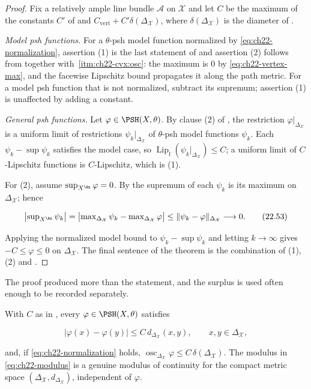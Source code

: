 \begin{proof}
Fix a relatively ample line bundle \(\mathcal A\) on \(\mathcal X\) and let
\(C\) be the maximum of the constants \(C'\) of
 and
\(C_{\mathrm{vert}}+C'\delta(\Delta_{\mathcal X})\), where
\(\delta(\Delta_{\mathcal X})\) is the diameter of
.

\emph{Model psh functions.}  For a \(\theta\)-psh model function normalized
by \eqref{eq:ch22-normalization}, assertion (1) is the last statement of
 and assertion (2) follows from
 together with
\,\cref{itm:ch22-cvx:osc}: the maximum
is \(0\) by \eqref{eq:ch22-vertex-max}, and the facewise Lipschitz bound
propagates it along the path metric.  For a model psh function that is not
normalized, subtract its supremum; assertion (1) is unaffected by adding a
constant.

\emph{General psh functions.}  Let \(\varphi\in\PSH(X,\theta)\).  By clause
(2) of , the restriction
\(\varphi|_{\Delta_{\mathcal X}}\) is a uniform limit of restrictions
\(\psi_k|_{\Delta_{\mathcal X}}\) of \(\theta\)-psh model functions
\(\psi_k\).  Each \(\psi_k-\sup\psi_k\) satisfies the model case, so
\(\operatorname{Lip}_{\mathrm f}(\psi_k|_{\Delta_{\mathcal X}})\leq C\); a
uniform limit of \(C\)-Lipschitz functions is \(C\)-Lipschitz, which is (1).

For (2), assume \(\sup_{X^{\An}}\varphi=0\).  By
 the supremum of each \(\psi_k\) is its
maximum on \(\Delta_{\mathcal X}\); hence

\[
 \bigl|\sup\nolimits_{X^{\An}}\psi_k\bigr|
 =\bigl|\max\nolimits_{\Delta_{\mathcal X}}\psi_k
    -\max\nolimits_{\Delta_{\mathcal X}}\varphi\bigr|
 \leq\|\psi_k-\varphi\|_{\Delta_{\mathcal X}}\longrightarrow0 .
\tag{22.53}\label{eq:ch22-normalizing-constants-vanish}
\]

Applying the normalized model bound to \(\psi_k-\sup\psi_k\) and letting
\(k\to\infty\) gives \(-C\leq\varphi\leq0\) on
\(\Delta_{\mathcal X}\).  The final sentence of the theorem is the
combination of (1), (2) and .
\end{proof}

The proof produced more than the statement, and the surplus is used often
enough to be recorded separately.

\begin{corollary}
\label{cor:ch22-explicit-modulus}
With \(C\) as in , every
\(\varphi\in\PSH(X,\theta)\) satisfies

\[
 \bigl|\varphi(x)-\varphi(y)\bigr|\leq C\,d_{\Delta_{\mathcal X}}(x,y),
 \qquad x,y\in\Delta_{\mathcal X},
\tag{22.54}\label{eq:ch22-modulus}
\]

and, if \eqref{eq:ch22-normalization} holds,
\(\operatorname{osc}_{\Delta_{\mathcal X}}\varphi
\leq C\,\delta(\Delta_{\mathcal X})\).  The modulus in
\eqref{eq:ch22-modulus} is a genuine modulus of continuity for the compact
metric space \((\Delta_{\mathcal X},d_{\Delta_{\mathcal X}})\), independent
of \(\varphi\).
\end{corollary}

